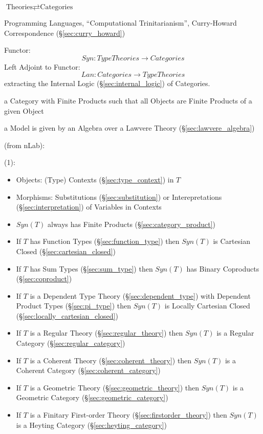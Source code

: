 $\text{Theories} \rightleftarrows \text{Categories}$

Programming Languages, ``Computational Trinitarianism'', Curry-Howard
Correspondence (\S\ref{sec:curry_howard})

Functor:
\[
  Syn : TypeTheories \rightarrow Categories
\]
Left Adjoint to Functor:
\[
  Lan : Categories \rightarrow TypeTheories
\]
extracting the Internal Logic (\S\ref{sec:internal_logic}) of
Categories.

a Category with Finite Products such
that all Objects are Finite Products of a given Object %

a Model is given by an Algebra over a Lawvere Theory
(\S\ref{sec:lawvere_algebra})


(from nLab):

(1):

\begin{itemize}
  \item Objects: (Type) Contexts (\S\ref{sec:type_context}) in $T$
  \item Morphisms: Substitutions (\S\ref{sec:substitution}) or
    Interepretations (\S\ref{sec:interpretation}) of Variables in
    Contexts
\end{itemize}

\begin{itemize}
  \item $Syn(T)$ always has Finite Products
    (\S\ref{sec:category_product})
  \item If $T$ has Function Types (\S\ref{sec:function_type}) then
    $Syn(T)$ is Cartesian Closed (\S\ref{sec:cartesian_closed})
  \item If $T$ has Sum Types (\S\ref{sec:sum_type}) then $Syn(T)$ has
    Binary Coproducts (\S\ref{sec:coproduct})
  \item If $T$ is a Dependent Type Theory (\S\ref{sec:dependent_type})
    with Dependent Product Types (\S\ref{sec:pi_type}) then $Syn(T)$
    is Locally Cartesian Closed (\S\ref{sec:locally_cartesian_closed})
  \item If $T$ is a Regular Theory (\S\ref{sec:regular_theory}) then
    $Syn(T)$ is a Regular Category (\S\ref{sec:regular_category})
  \item If $T$ is a Coherent Theory (\S\ref{sec:coherent_theory}) then
    $Syn(T)$ is a Coherent Category (\S\ref{sec:coherent_category})
  \item If $T$ is a Geometric Theory (\S\ref{sec:geometric_theory}) then
    $Syn(T)$ is a Geometric Category (\S\ref{sec:geometric_category})
  \item If $T$ is a Finitary First-order Theory
    (\S\ref{sec:firstorder_theory}) then $Syn(T)$ is a Heyting
    Category (\S\ref{sec:heyting_category})
\end{itemize}


